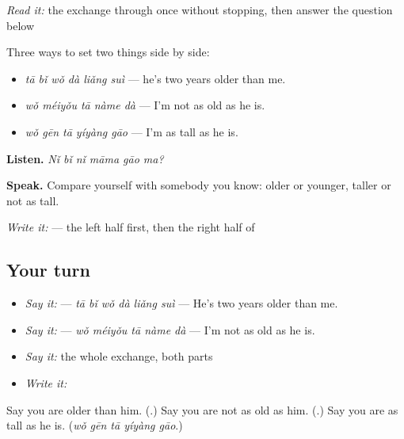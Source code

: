 \begin{tcolorbox}[breakable,skin=enhanced,colback=orange!6,colframe=orange!45!black,boxrule=0.5pt,arc=1mm,left=6pt,right=6pt,top=4pt,bottom=4pt,fonttitle=\bfseries,title={Read this}]
\emph{Read it:} the exchange through once without stopping, then answer the question below
\end{tcolorbox}

\begin{grammarlens}[title={What you've built — more, less and the same}]
Three ways to set two things side by side:

\begin{itemize}
\raggedright
  \item \textbf{} \emph{tā bǐ wǒ dà liǎng suì} — he's two years older than me.
  \item \textbf{} \emph{wǒ méiyǒu tā nàme dà} — I'm not as old as he is.
  \item \emph{wǒ gēn tā yíyàng gāo} — I'm as tall as he is.
\end{itemize}

\textbf{Listen.} \emph{Nǐ bǐ nǐ māma gāo ma?}

\textbf{Speak.} Compare yourself with somebody you know: older or younger, taller or not as tall.

\emph{Write it:}  — the left half first, then the right half of 
\end{grammarlens}

\subsection*{Your turn}
\begin{itemize}
\raggedright
  \item \emph{Say it:}  — \emph{tā bǐ wǒ dà liǎng suì} — He's two years older than me.
  \item \emph{Say it:}  — \emph{wǒ méiyǒu tā nàme dà} — I'm not as old as he is.
  \item \emph{Say it:} the whole exchange, both parts
  \item \emph{Write it:} 
\end{itemize}

\begin{tcolorbox}[breakable,colback=teal!4,colframe=teal!35!black,title={Before you move on}]
Say you are older than him. (\textbf{}.) Say you are not as old as him. (\textbf{}.) Say you are as tall as he is. (\emph{wǒ gēn tā yíyàng gāo}.)
\end{tcolorbox}
